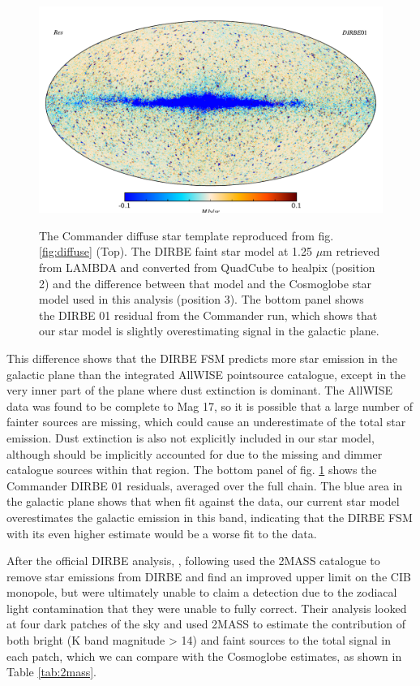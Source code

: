 \documentclass{aa}
\begin{document}
\begin{figure}
  \includegraphics[width=\columnwidth]{figs/diffuseTemplate/band01_res.pdf}\\
  \caption{The Commander diffuse star template reproduced from fig. \ref{fig:diffuse} (Top). The DIRBE faint star model at 1.25 $\mu$m retrieved from LAMBDA and converted from QuadCube to healpix (position 2) and the difference between that model and the Cosmoglobe star model used in this analysis (position 3). The bottom panel shows the DIRBE 01 residual from the Commander run, which shows that our star model is slightly overestimating signal in the galactic plane.}
  \label{fig:DIRBEfaint}
\end{figure}

This difference shows that the DIRBE FSM predicts more star emission in the galactic plane than the integrated AllWISE pointsource catalogue, except in the very inner part of the plane where dust extinction is dominant. The AllWISE data was found to be complete to Mag 17, so it is possible that a large number of fainter sources are missing, which could cause an underestimate of the total star emission. Dust extinction is also not explicitly included in our star model, although should be implicitly accounted for due to the missing and dimmer catalogue sources within that region. The bottom panel of fig. \ref{fig:DIRBEfaint} shows the Commander DIRBE 01 residuals, averaged over the full chain. The blue area in the galactic plane shows that when fit against the data, our current star model overestimates the galactic emission in this band, indicating that the DIRBE FSM with its even higher estimate would be a worse fit to the data. 

After the official DIRBE analysis, \cite{DIRBE2mass}, following \cite{gorjian} used the 2MASS catalogue to remove star emissions from DIRBE and find an improved upper limit on the CIB monopole, but were ultimately unable to claim a detection due to the zodiacal light contamination that they were unable to fully correct. Their analysis looked at four dark patches of the sky and used 2MASS to estimate the contribution of both bright (K band magnitude > 14) and faint sources to the total signal in each patch, which we can compare with the Cosmoglobe estimates, as shown in Table \ref{tab:2mass}.
\end{document}
